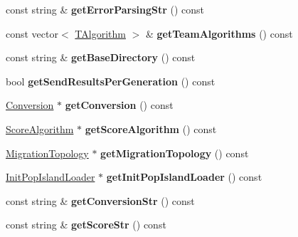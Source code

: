 \begin{DoxyCompactItemize}
const string \& {\bfseries get\+Error\+Parsing\+Str} () const
\item 
\mbox{\label{classConfiguration_ab1831019b0d91d59b966f1ac6ed57604}} 
const vector$<$ \mbox{\hyperlink{structTAlgorithm}{T\+Algorithm}} $>$ \& {\bfseries get\+Team\+Algorithms} () const
\item 
\mbox{\label{classConfiguration_af14a5124c3642ad449bd9b97876b6de1}} 
const string \& {\bfseries get\+Base\+Directory} () const
\item 
\mbox{\label{classConfiguration_a764358a2f2b54e84d5a9c0bf0aaef62d}} 
bool {\bfseries get\+Send\+Results\+Per\+Generation} () const
\item 
\mbox{\label{classConfiguration_afcdd6f9fd05945f7fcac6e3e3fd1d163}} 
\mbox{\hyperlink{classConversion}{Conversion}} $\ast$ {\bfseries get\+Conversion} () const
\item 
\mbox{\label{classConfiguration_a1bf94d56f4741e38c8f849a3a229cb55}} 
\mbox{\hyperlink{classScoreAlgorithm}{Score\+Algorithm}} $\ast$ {\bfseries get\+Score\+Algorithm} () const
\item 
\mbox{\label{classConfiguration_a7b7c19c4ac9229e6eaefc91e7e9535b2}} 
\mbox{\hyperlink{classMigrationTopology}{Migration\+Topology}} $\ast$ {\bfseries get\+Migration\+Topology} () const
\item 
\mbox{\label{classConfiguration_a512dec2a8c7852caec69602619797646}} 
\mbox{\hyperlink{classInitPopIslandLoader}{Init\+Pop\+Island\+Loader}} $\ast$ {\bfseries get\+Init\+Pop\+Island\+Loader} () const
\item 
\mbox{\label{classConfiguration_a58adc5e15e30ac4e9deb8ddcc6c997c3}} 
const string \& {\bfseries get\+Conversion\+Str} () const
\item 
\mbox{\label{classConfiguration_aba883d8ff9cfca35f9dfc70dbef47a27}} 
const string \& {\bfseries get\+Score\+Str} () const
\item 
\mbox{\label{classConfiguration_af6cdb26961114dd7dbcd165ed1457d2c}} 

\end{DoxyCompactItemize}
